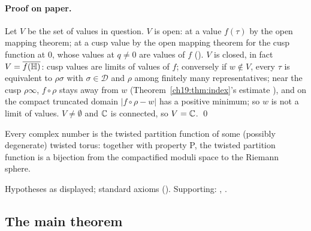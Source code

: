 \paragraph{Proof on paper.}  Let $V$ be the set of values in question.  $V$ is open: at a value $f(\tau)$ by the open mapping theorem; at a cusp
value by the open mapping theorem for the cusp function at $0$, whose values at $q\ne0$ are values of $f$
().  $V$ is closed, in fact $V=\overline{f(\mathbb{H})}$: cusp values are limits of values of $f$;
conversely if $w\notin V$, every $\tau$ is equivalent to $\rho\sigma$ with $\sigma\in\mathcal D$ and $\rho$ among finitely many representatives; near the cusp
$\rho\infty$, $f\circ\rho$ stays away from $w$ (Theorem~\ref{ch19:thm:index}'s estimate ), and on the compact
truncated domain $|f\circ\rho-w|$ has a positive minimum; so $w$ is not a limit of values.  $V\ne\emptyset$ and ${\mathbb{C}}$ is connected, so $V={\mathbb{C}}$. \qed
\begin{physics}Every complex number is the twisted partition function of some (possibly degenerate) twisted torus: together with property
P, the twisted partition function is a bijection from the compactified moduli space to the Riemann sphere.\end{physics}
\begin{status}Hypotheses as displayed; standard axioms ().  Supporting:
, .\end{status}

\subsection{The main theorem}

